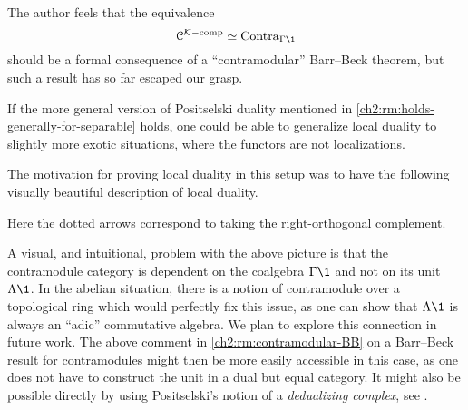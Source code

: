 \begin{remark}
    \label{ch2:rm:contramodular-BB}
    The author feels that the equivalence 
    \[\C\Kcomp\simeq \Contra_{\Gamma\1}\] 
    should be a formal consequence of a ``contramodular'' Barr--Beck theorem, but such a result has so far escaped our grasp. 
\end{remark}

\begin{remark}
    If the more general version of Positselski duality mentioned in \cref{ch2:rm:holds-generally-for-separable} holds, one could be able to generalize local duality to slightly more exotic situations, where the functors are not localizations. 
\end{remark}

The motivation for proving local duality in this setup was to have the following visually beautiful description of local duality. 

\begin{center}
\end{center}

Here the dotted arrows correspond to taking the right-orthogonal complement. 

\begin{remark}
    \label{ch2:rm:contramodule-over-pro-ring}
    A visual, and intuitional, problem with the above picture is that the contramodule category is dependent on the coalgebra $\Gamma\1$ and not on its unit $\Lambda \1$. In the abelian situation, there is a notion of contramodule over a topological ring which would perfectly fix this issue, as one can show that $\Lambda \1$ is always an ``adic'' commutative algebra. We plan to explore this connection in future work. The above comment in \cref{ch2:rm:contramodular-BB} on a Barr--Beck result for contramodules might then be more easily accessible in this case, as one does not have to construct the unit in a dual but equal category. It might also be possible directly by using Positselski's notion of a \emph{dedualizing complex}, see \cite{positselski_2016}. 
\end{remark}

